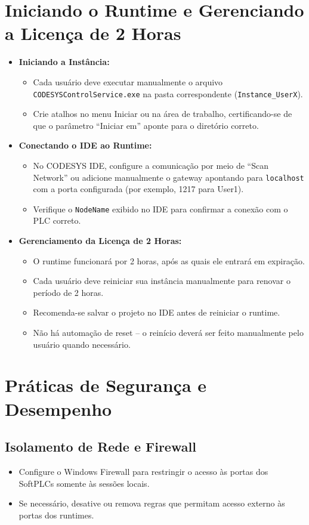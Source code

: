 \documentclass[12pt,a4paper]{article}
\begin{document}
\section{Iniciando o Runtime e Gerenciando a Licença de 2 Horas}
\begin{itemize}[label=\textbullet]
  \item \textbf{Iniciando a Instância:}
    \begin{itemize}
      \item Cada usuário deve executar manualmente o arquivo \texttt{CODESYSControlService.exe} na pasta correspondente (\texttt{Instance\_UserX}).
      \item Crie atalhos no menu Iniciar ou na área de trabalho, certificando-se de que o parâmetro ``Iniciar em'' aponte para o diretório correto.
    \end{itemize}
  \item \textbf{Conectando o IDE ao Runtime:}
    \begin{itemize}
      \item No CODESYS IDE, configure a comunicação por meio de ``Scan Network'' ou adicione manualmente o gateway apontando para \texttt{localhost} com a porta configurada (por exemplo, 1217 para User1).
      \item Verifique o \texttt{NodeName} exibido no IDE para confirmar a conexão com o PLC correto.
    \end{itemize}
  \item \textbf{Gerenciamento da Licença de 2 Horas:}
    \begin{itemize}
      \item O runtime funcionará por 2 horas, após as quais ele entrará em expiração.
      \item Cada usuário deve reiniciar sua instância manualmente para renovar o período de 2 horas.
      \item Recomenda-se salvar o projeto no IDE antes de reiniciar o runtime.
      \item Não há automação de reset – o reinício deverá ser feito manualmente pelo usuário quando necessário.
    \end{itemize}
\end{itemize}

\section{Práticas de Segurança e Desempenho}
\subsection*{Isolamento de Rede e Firewall}
\begin{itemize}[label=\textbullet]
  \item Configure o Windows Firewall para restringir o acesso às portas dos SoftPLCs somente às sessões locais.
  \item Se necessário, desative ou remova regras que permitam acesso externo às portas dos runtimes.
\end{itemize}
\end{document}
